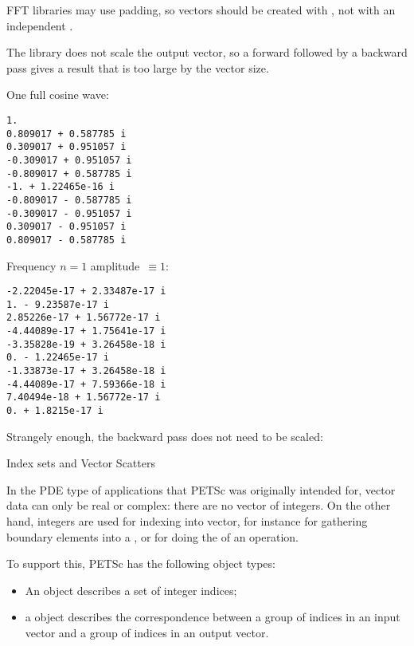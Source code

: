 FFT libraries may use padding, so vectors should be created with
,
not with an independent .

The  library does not scale the output vector,
so a forward followed by a backward pass gives a result that is too large
by the vector size.


\begin{multicols}{2}
One full cosine wave:
\begin{verbatim}
1.
0.809017 + 0.587785 i
0.309017 + 0.951057 i
-0.309017 + 0.951057 i
-0.809017 + 0.587785 i
-1. + 1.22465e-16 i
-0.809017 - 0.587785 i
-0.309017 - 0.951057 i
0.309017 - 0.951057 i
0.809017 - 0.587785 i
\end{verbatim}
\columnbreak
Frequency $n=1$ amplitude~$\equiv1$:
\begin{verbatim}
-2.22045e-17 + 2.33487e-17 i
1. - 9.23587e-17 i
2.85226e-17 + 1.56772e-17 i
-4.44089e-17 + 1.75641e-17 i
-3.35828e-19 + 3.26458e-18 i
0. - 1.22465e-17 i
-1.33873e-17 + 3.26458e-18 i
-4.44089e-17 + 7.59366e-18 i
7.40494e-18 + 1.56772e-17 i
0. + 1.8215e-17 i
\end{verbatim}
\end{multicols}

Strangely enough, the backward pass does not need to be scaled:


 {Index sets and Vector Scatters}

In the \ac{PDE} type of applications that PETSc was originally intended for,
vector data can only be real or complex: there are no vector of integers.
On the other hand, integers are used for indexing into vector,
for instance for gathering boundary elements into a ,
or for doing the  of an  operation.

To support this, PETSc has the following object types:
\begin{itemize}
\item An  object describes a set of integer indices;
\item a  object describes the correspondence between
  a group of indices in an input vector and a group of indices in an output vector.
\end{itemize}

